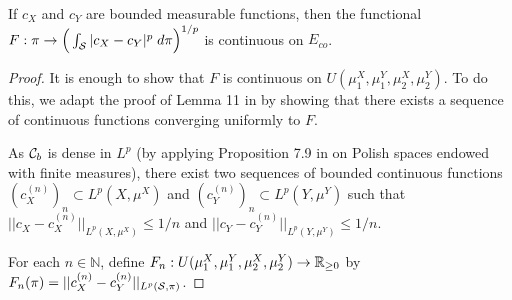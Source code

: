 \begin{lemma} \label{continuous}
    If $c_X$ and $c_Y$ are bounded measurable functions, then
    the functional $F: \pi \to \Big( \int_{\mathcal S} \vert c_X - c_Y \vert^p \; d\pi \Big)^{1/p}$ is continuous on $E_{co}$.
  \end{lemma}
  \begin{proof}
    It is enough to show that $F$ is continuous on $U(\mu_1^X, \mu_1^Y, \mu_2^X, \mu_2^Y)$.
    To do this, we adapt the proof of Lemma 11 in \citep{Chowdhury19} by showing that
    there exists a sequence of continuous functions converging uniformly to $F$.

    As $\mathcal C_b$ is dense in $L^p$ (by applying Proposition 7.9 in \citep{Folland99}
    on Polish spaces endowed with finite measures), there exist two sequences of
    bounded continuous functions $(c_X^{(n)})_n \subset L^p(X, \mu^X)$ and
    $(c_Y^{(n)})_n \subset L^p(Y, \mu^Y)$ such that
    $\vert\vert c_X - c_X^{(n)} \vert\vert_{L^p(X, \mu^X)} \leq 1/n$ and
    $\vert\vert c_Y - c_Y^{(n)} \vert\vert_{L^p(Y, \mu^Y)} \leq 1/n$.

    For each $n \in \mathbb N$, define $F_n: U(\mu_1^X, \mu_1^Y, \mu_2^X, \mu_2^Y) \to \mathbb R_{\geq 0}$
    by $F_n(\pi) = \vert\vert c_X^{(n)} - c_Y^{(n)} \vert\vert_{L^p(\mathcal S, \pi)}$.


\end{proof}
